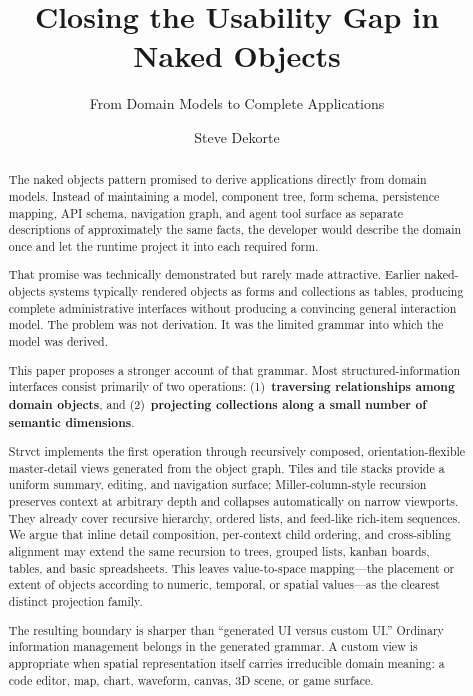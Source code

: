 \documentclass[sigplan,review,anonymous,10pt]{acmart}
\begin{document}
\title{Closing the Usability Gap in Naked Objects}
\subtitle{From Domain Models to Complete Applications}

\author{Steve Dekorte}

\begin{abstract}
The naked objects pattern promised to derive applications directly from domain models. Instead of maintaining a model, component tree, form schema, persistence mapping, API schema, navigation graph, and agent tool surface as separate descriptions of approximately the same facts, the developer would describe the domain once and let the runtime project it into each required form.

That promise was technically demonstrated but rarely made attractive. Earlier naked-objects systems typically rendered objects as forms and collections as tables, producing complete administrative interfaces without producing a convincing general interaction model. The problem was not derivation. It was the limited grammar into which the model was derived.

This paper proposes a stronger account of that grammar. Most structured-information interfaces consist primarily of two operations: (1)~\textbf{traversing relationships among domain objects}, and (2)~\textbf{projecting collections along a small number of semantic dimensions}.

Strvct implements the first operation through recursively composed, orientation-flexible master-detail views generated from the object graph. Tiles and tile stacks provide a uniform summary, editing, and navigation surface; Miller-column-style recursion preserves context at arbitrary depth and collapses automatically on narrow viewports. They already cover recursive hierarchy, ordered lists, and feed-like rich-item sequences. We argue that inline detail composition, per-context child ordering, and cross-sibling alignment may extend the same recursion to trees, grouped lists, kanban boards, tables, and basic spreadsheets. This leaves value-to-space mapping---the placement or extent of objects according to numeric, temporal, or spatial values---as the clearest distinct projection family.

The resulting boundary is sharper than ``generated UI versus custom UI.'' Ordinary information management belongs in the generated grammar. A custom view is appropriate when spatial representation itself carries irreducible domain meaning: a code editor, map, chart, waveform, canvas, 3D scene, or game surface.


\end{abstract}
\end{document}

